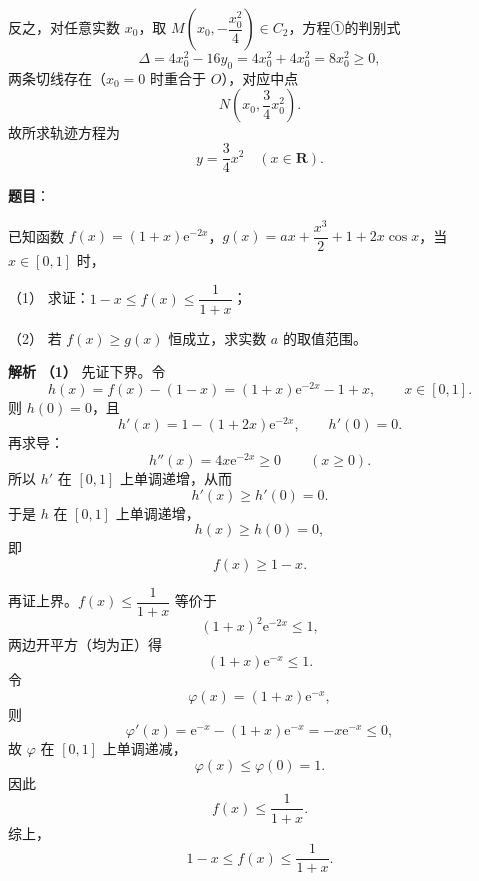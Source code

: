 \begin{answer}
反之，对任意实数 $x_0$，取 $M\left(x_0,-\dfrac{x_0^2}4\right)\in C_2$，方程①的判别式
\nopagebreak[4]
\[\Delta=4x_0^2-16y_0=4x_0^2+4x_0^2=8x_0^2\geqslant0,\]
两条切线存在（$x_0=0$ 时重合于 $O$），对应中点
\nopagebreak[4]
\[N\left(x_0,\frac34x_0^2\right).\]
故所求轨迹方程为
\nopagebreak[4]
\[y=\frac34x^2\quad(x\in\mathbf R).\]



\end{answer}
\begin{answer}

\textbf{题目}：

已知函数 $f(x)=(1+x)\mathrm e^{-2x}$，$g(x)=ax+\dfrac{x^3}2+1+2x\cos x$，当 $x\in[0,1]$ 时，

（1） 求证：$1-x\leqslant f(x)\leqslant\dfrac1{1+x}$；

（2） 若 $f(x)\geqslant g(x)$ 恒成立，求实数 $a$ 的取值范围。

\textbf{解析}
\textbf{（1）} 先证下界。令
\nopagebreak[4]
\[h(x)=f(x)-(1-x)=(1+x)\mathrm e^{-2x}-1+x,\qquad x\in[0,1].\]
则 $h(0)=0$，且
\nopagebreak[4]
\[h'(x)=1-(1+2x)\mathrm e^{-2x},\qquad h'(0)=0.\]
再求导：
\nopagebreak[4]
\[h''(x)=4x\mathrm e^{-2x}\geqslant0\qquad(x\geqslant0).\]
所以 $h'$ 在 $[0,1]$ 上单调递增，从而
\nopagebreak[4]
\[h'(x)\geqslant h'(0)=0.\]
于是 $h$ 在 $[0,1]$ 上单调递增，
\nopagebreak[4]
\[h(x)\geqslant h(0)=0,\]
即
\nopagebreak[4]
\[f(x)\geqslant1-x.\]

再证上界。$f(x)\leqslant\dfrac1{1+x}$ 等价于
\nopagebreak[4]
\[(1+x)^2\mathrm e^{-2x}\leqslant1,\]
两边开平方（均为正）得
\nopagebreak[4]
\[(1+x)\mathrm e^{-x}\leqslant1.\]
令
\nopagebreak[4]
\[\varphi(x)=(1+x)\mathrm e^{-x},\]
则
\nopagebreak[4]
\[\varphi'(x)=\mathrm e^{-x}-(1+x)\mathrm e^{-x}=-x\mathrm e^{-x}\leqslant0,\]
故 $\varphi$ 在 $[0,1]$ 上单调递减，
\nopagebreak[4]
\[\varphi(x)\leqslant\varphi(0)=1.\]
因此
\nopagebreak[4]
\[f(x)\leqslant\frac1{1+x}.\]
综上，
\nopagebreak[4]
\[1-x\leqslant f(x)\leqslant\frac1{1+x}.\]


\end{answer}
